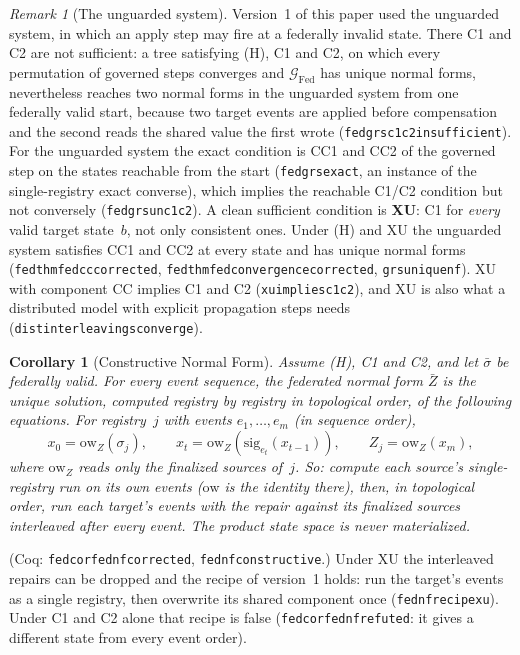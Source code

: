 \documentclass[11pt,a4paper]{article}
\theoremstyle{plain}
\newtheorem{corollary}[theorem]{Corollary}
\theoremstyle{definition}
\theoremstyle{remark}
\newtheorem{remark}[theorem]{Remark}
\newcommand{\Fed}{\mathrm{Fed}}
\renewcommand{\_}{\textunderscore\allowbreak}
\begin{document}
\begin{remark}[The unguarded system]
\label{rem:unguarded}
Version~1 of this paper used the unguarded system, in which an apply step may
fire at a federally invalid state.  There C1 and C2 are not sufficient: a tree
satisfying (H), C1 and C2, on which every permutation of governed steps
converges and $\mathcal{G}_\Fed$ has unique normal forms, nevertheless reaches
two normal forms in the unguarded system from one federally valid start,
because two target events are applied before compensation and the second reads
the shared value the first wrote (\texttt{fed\_grs\_c1\_c2\_insufficient}).
For the unguarded system the exact condition is CC1 and CC2 of the governed
step on the states reachable from the start (\texttt{fed\_grs\_exact}, an
instance of the single-registry exact converse), which implies the reachable
C1/C2 condition but not conversely (\texttt{fed\_grs\_un\_c1\_c2}).  A clean
sufficient condition is \textbf{XU}: C1 for \emph{every} valid target state~$b$,
not only consistent ones.  Under (H) and XU the unguarded system satisfies CC1
and CC2 at every state and has unique normal forms
(\texttt{fed\_thm\_fed\_cc\_corrected},
\texttt{fed\_thm\_fed\_convergence\_corrected}, \texttt{grs\_unique\_nf}).  XU
with component CC implies C1 and C2 (\texttt{xu\_implies\_c1\_c2}), and XU is
also what a distributed model with explicit propagation steps needs
(\texttt{dist\_interleavings\_converge}).
\end{remark}

\begin{corollary}[Constructive Normal Form]
\label{cor:fed-nf}
Assume (H), C1 and C2, and let $\bar{\sigma}$ be federally valid.  For every
event sequence, the federated normal form $\bar{Z}$ is the unique solution,
computed registry by registry in topological order, of the following
equations.  For registry~$j$ with events $e_1, \ldots, e_m$ (in sequence order),
\[
x_0 = \mathrm{ow}_{Z}(\sigma_j), \qquad
x_t = \mathrm{ow}_{Z}(\mathrm{sig}_{e_t}(x_{t-1})), \qquad
Z_j = \mathrm{ow}_{Z}(x_m),
\]
where $\mathrm{ow}_Z$ reads only the finalized sources of~$j$.  So: compute each
source's single-registry run on its own events ($\mathrm{ow}$ is the identity
there), then, in topological order, run each target's events with the repair
against its finalized sources interleaved after \emph{every} event.  The
product state space is never materialized.
\end{corollary}

(Coq: \texttt{fed\_cor\_fed\_nf\_corrected}, \texttt{fed\_nf\_constructive}.)
Under XU the interleaved repairs can be dropped and the recipe of version~1
holds: run the target's events as a single registry, then overwrite its shared
component once (\texttt{fed\_nf\_recipe\_xu}).  Under C1 and C2 alone that
recipe is false (\texttt{fed\_cor\_fed\_nf\_refuted}: it gives a different state
from every event order).
\end{document}
